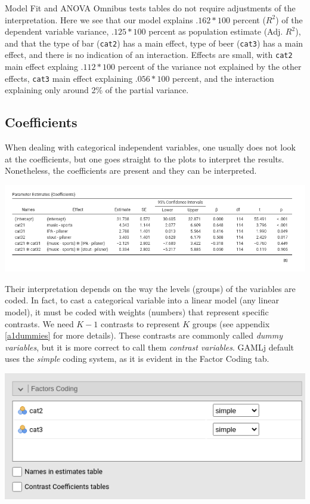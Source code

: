 \documentclass[
]{book}
\begin{document}
{Model Fit} and {ANOVA Omnibus tests} tables do not require adjustments of the interpretation. Here we see that our model explains \(.162*100\) percent (\(R^2\)) of the dependent variable variance, \(.125*100\) percent as population estimate (Adj. \(R^2\)), and that the type of bar (\texttt{cat2}) has a main effect, type of beer (\texttt{cat3}) has a main effect, and there is no indication of an interaction. Effects are small, with \texttt{cat2} main effect explaing \(.112*100\) percent of the variance not explained by the other effects, \texttt{cat3} main effect explaining \(.056*100\) percent, and the interaction explaining only around 2\% of the partial variance.

\hypertarget{dummies}{%
\subsection{Coefficients}\label{dummies}}

When dealing with categorical independent variables, one usually does not look at the coefficients, but one goes straight to the plots to interpret the results. Nonetheless, the coefficients are present and they can be interpreted.

\includegraphics{bookletpics/2_anova_output3.png}

Their interpretation depends on the way the levels (groups) of the variables are coded. In fact, to cast a categorical variable into a linear model (any linear model), it must be coded with weights (numbers) that represent specific contrasts. We need \(K-1\) contrasts to represent \(K\) groups (see appendix \ref{a1dummies} for more details). These contrasts are commonly called \emph{dummy variables}, but it is more correct to call them \emph{contrast variables}. {GAMLj} default uses the \emph{simple} coding system, as it is evident in the {Factor Coding} tab.

\includegraphics{bookletpics/2_anova_input4.png}
\end{document}
